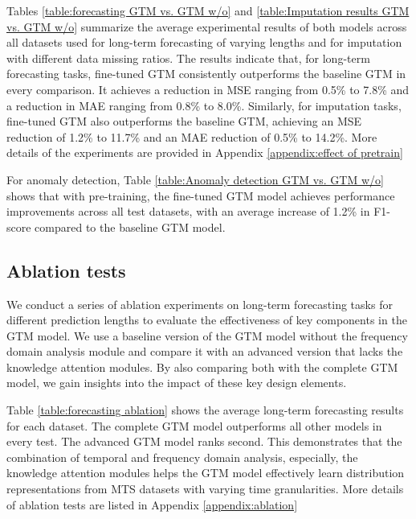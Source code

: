 Tables \ref{table:forecasting GTM vs. GTM w/o} and \ref{table:Imputation results GTM vs. GTM w/o} summarize the average experimental results of both models across all datasets used for long-term forecasting of varying lengths and for imputation with different data missing ratios. The results indicate that, for long-term forecasting tasks, fine-tuned GTM consistently outperforms the baseline GTM in every comparison. It achieves a reduction in MSE ranging from 0.5\% to 7.8\% and a reduction in MAE ranging from 0.8\% to 8.0\%. Similarly, for imputation tasks, fine-tuned GTM also outperforms the baseline GTM, achieving an MSE reduction of 1.2\% to 11.7\% and an MAE reduction of 0.5\% to 14.2\%. More details of the experiments are provided in Appendix \ref{appendix:effect of pretrain}


For anomaly detection, Table \ref{table:Anomaly detection GTM vs. GTM w/o} shows that with pre-training, the fine-tuned GTM model achieves performance improvements across all test datasets, with an average increase of 1.2\% in F1-score compared to the baseline GTM model.

 


\subsection{Ablation tests}



We conduct a series of ablation experiments on long-term forecasting tasks for different prediction lengths to evaluate the effectiveness of key components in the GTM model.
We use a baseline version of the GTM model without the frequency domain analysis module and compare it with an advanced version that lacks the knowledge attention modules. By also comparing both with the complete GTM model, we gain insights into the impact of these key design elements.



Table \ref{table:forecasting ablation} shows the average long-term forecasting results for each dataset. The complete GTM model outperforms all other models in every test. The advanced GTM model ranks second. This demonstrates that the combination of temporal and frequency domain analysis, especially, the knowledge attention modules helps the GTM model effectively learn distribution representations from MTS datasets with varying time granularities. More details of ablation tests are listed in Appendix \ref{appendix:ablation}




